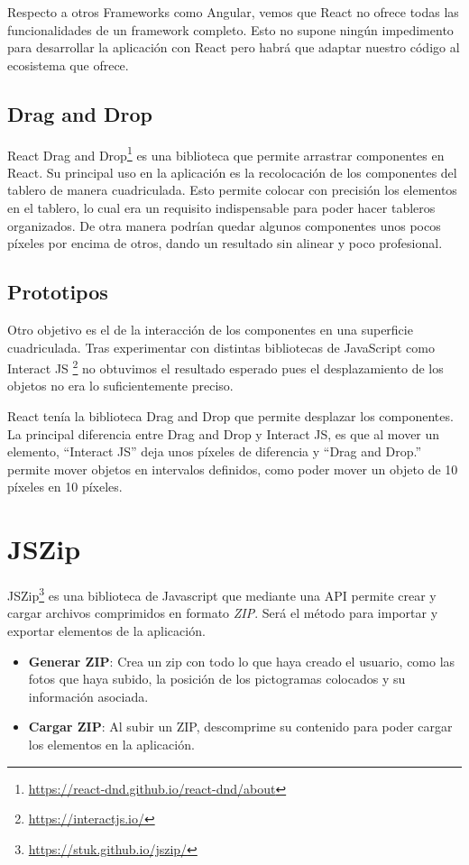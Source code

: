 Respecto a otros Frameworks como Angular, vemos que React no ofrece todas las funcionalidades de un framework completo. Esto no supone ningún impedimento para desarrollar la aplicación con React pero habrá que adaptar nuestro código al ecosistema que ofrece.



\subsection{Drag and Drop}

React Drag and Drop\footnote{\url{https://react-dnd.github.io/react-dnd/about}} es una biblioteca que permite arrastrar componentes en React. Su principal uso en la aplicación es la recolocación de los componentes del tablero de manera cuadriculada. Esto permite colocar con precisión los elementos en el tablero, lo cual era un requisito indispensable para poder hacer tableros organizados. De otra manera podrían quedar algunos componentes unos pocos píxeles por encima de otros, dando un resultado sin alinear y poco profesional.

\subsection{Prototipos}

Otro objetivo es el de la interacción de los componentes en una superficie cuadriculada. Tras experimentar con distintas bibliotecas de JavaScript como Interact JS \footnote{\url{https://interactjs.io/}} no obtuvimos el resultado esperado pues el desplazamiento de los objetos no era lo suficientemente preciso.

React tenía la biblioteca Drag and Drop que permite desplazar los componentes. La principal diferencia entre Drag and Drop y Interact JS, es que al mover un elemento, “Interact JS”  deja unos píxeles de diferencia y “Drag and Drop.” permite mover objetos en intervalos definidos, como poder mover un objeto de 10 píxeles en 10 píxeles.

\section{JSZip}
\label{cap3:sec:jszip}
JSZip\footnote{\url{https://stuk.github.io/jszip/}} es una biblioteca de Javascript que mediante una API permite crear y cargar archivos comprimidos en formato \textit{ZIP}. Será el método para importar y exportar elementos de la aplicación.
\begin{itemize}
	\item \textbf{Generar ZIP}: Crea un zip con todo lo que haya creado el usuario, como las fotos que haya subido, la posición de los pictogramas colocados y su información asociada.
	\item \textbf{Cargar ZIP}: Al subir un ZIP, descomprime su contenido para poder cargar los elementos en la aplicación.
\end{itemize}	


